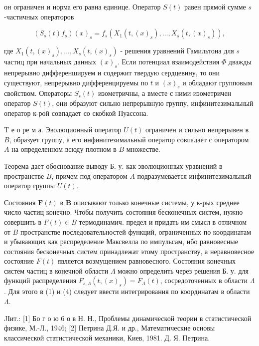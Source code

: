 \documentclass[10pt]{article}
\begin{document}
он ограничен и норма его равна единице. Оператор $S(t)$ равен прямой сумме $s$-частичных операторов



\[

\left(S_{s}(t) f_{s}\right)(x)_{s}=f_{s}\left(X_{1}\left(t,(x)_{s}\right), \ldots, X_{s}\left(t,(x)_{s}\right)\right),

\]



где $X_{1}\left(t,(x)_{s}\right), \ldots, X_{s}\left(t,(x)_{s}\right)$ - решения уравнений Гамильтона для $s$ частиц при начальных данных $(x)_{s}$. Если потенциал взаимодействия $\Phi$ дважды непрерывно дифференшируем и содержит твердую сердцевину, то они существуют, непрерывно дифференцируемы по $t$ и $(x)_{s}$ и обладают групповым свойством. Операторы $S_{s}(t)$ изометричны, а вместе с ними изометричен оператор $S(t)$, они образуют сильно непрерывную группу, инфинитезимальный оператор к-рой совпадает со скобкой Пуассона.



T е о ре м а. Эволюционный оператор $U(t)$ ограничен и сильно непрерывен в $B$, образует группу, а его инфинитезимальный оператор совпадает с оператором $A$ на определенном всюду плотном в $B$ множестве.



Теорема дает обоснование выводу Б. у. как эволюционных уравнений в пространстве $B$, причем под оператором $A$ подразумевается инфинитезимальный оператор группы $U(t)$.



Состояния $\boldsymbol{F}(t)$ в $\boldsymbol{B}$ описывают только конечные системы, у к-рых среднее число частиц конечно. Чтобы получить состояния бесконечных систем, нужно совершить в $F(t) \in B$ термодинамич. предел и придать им смысл в отличном от $B$ пространстве последовательностей функций, ограниченных по координатам и убывающих как распределение Максвелла по импульсам, ибо равновесные состояния бесконечных систем принадлежат этому пространству, а неравновесное состояние $F(t)$ является возмущением равновесного. Состояния конечных систем частиц в конечной области $\Lambda$ можно определить через решения Б. у. для функций распределения $F_{s, \Lambda}\left(t,(x)_{s}\right)=F_{\Lambda}(t)$, сосредоточенных в области $\Lambda$. Для этого в (1) и (4) следует ввести интегрирования по координатам в области $\Lambda$.



JІит.: [1] Бо г о ю 6 о в Н. Н., Проблемы динамической теории в статистической физике, М.-Л., 1946; [2] Петрина Д.Я. и др., Математические основы классической статистической механики, Киев, 1981. Д. Я. Петрина.
\end{document}
